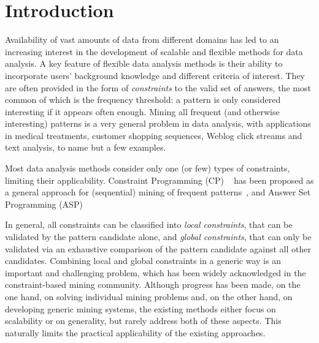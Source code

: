 

\section{Introduction}\label{sec:intro}
Availability of vast amounts of data from different domains has led to an increasing interest in the development of scalable and flexible methods for data analysis.
A key feature of flexible data analysis methods is their ability to incorporate users' background knowledge and different criteria of interest. They are often provided in the form of \emph{constraints} to the valid set of answers, the most common of which is the frequency threshold: a pattern is only considered interesting if it appears often enough. Mining all frequent (and otherwise interesting) patterns is a very general problem in data analysis, with applications in medical treatments, customer shopping sequences, Weblog click streams and text analysis, to name but a few examples.

Most data analysis methods consider only one (or few) types of constraints, limiting their applicability. Constraint Programming (CP) ~\parencite{DBLP:conf/cpaior/NegrevergneG15,DBLP:journals/ai/GunsDNTR17} has been proposed as a general approach for (sequential) mining of frequent patterns~\parencite{DBLP:books/mit/fayyadPSU96/AgrawalMSTV96}, and Answer Set Programming (ASP) 


In general, all constraints can be classified into \emph{local constraints}, that can be validated by the pattern candidate alone, and \emph{global constraints}, that can only be validated via an exhaustive comparison of the pattern candidate against all other candidates. Combining local and global constraints in a generic way is an important and challenging problem, which has been widely acknowledged in the constraint-based mining community.  Although progress has been made, on the one hand, on solving individual mining problems and, on the other hand, on developing generic mining systems, the existing methods either focus on scalability or on generality, but rarely address both of these aspects. This naturally limits the practical applicability of the existing approaches.

